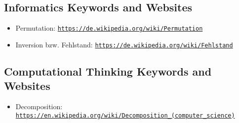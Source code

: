 \documentclass[a4paper,11pt]{report}
\newcommand{\BrochureUrlText}[1]{\texttt{#1}}
\begin{document}
\subsection*{Informatics Keywords and Websites}

\begin{itemize}
  \item Permutation: \href{https://de.wikipedia.org/wiki/Permutation}{\BrochureUrlText{https://de.wikipedia.org/wiki/Permutation}}
  \item Inversion bzw. Fehlstand: \href{https://de.wikipedia.org/wiki/Fehlstand}{\BrochureUrlText{https://de.wikipedia.org/wiki/Fehlstand}}
\end{itemize}


\subsection*{Computational Thinking Keywords and Websites}

\begin{itemize}
  \item Decomposition: \href{https://en.wikipedia.org/wiki/Decomposition_(computer_science)}{\BrochureUrlText{https://en.wikipedia.org/wiki/Decomposition\_(computer\_science)}}
\end{itemize}
\end{document}
